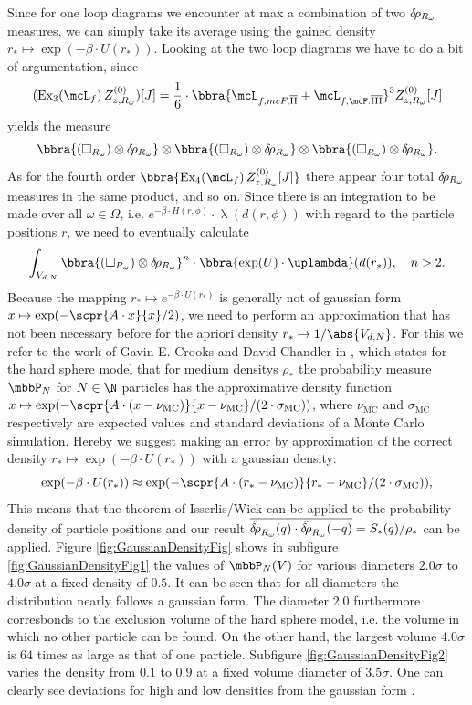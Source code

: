 



Since for one loop diagrams we encounter at max a combination of two $\delta\hspace*{-0.15em}\rho_{R_\omega}$ measures, we can simply take its average using the gained density $r_*\mapsto\exp(-\beta\cdot U(r_*))$. Looking at the two loop diagrams we have to do a bit of argumentation, since
\[
    (\text{Ex}_3(\mcL_f)\,Z_{z,R_\omega}^{(0)})[J] = \frac{1}{6}\cdot\bbra{
        \mcL_{f,mcF,\overline{\text{II}}} + \mcL_{f,\mcF.\overline{\text{III}}}
    }^3Z_{z,R_\omega}^{(0)}[J]
\] 
yields the measure
\[
    \bbra{(\square_{R_\omega})\otimes\drho_{R_\omega}}\otimes\bbra{(\square_{R_\omega})\otimes\drho_{R_\omega}}\otimes\bbra{(\square_{R_\omega})\otimes\drho_{R_\omega}}.
\]
As for the fourth order $\bbra{\text{Ex}_4(\mcL_f)\,Z_{z,R_\omega}^{(0)}[J]}$ there appear four total $\delta\hspace*{-0.15em}\rho_{R_\omega}$ measures in the same product, and so on. Since there is an integration to be made over all $\omega\in\Omega$, i.e. $e^{-\beta\cdot H(r,\phi)}\cdot\uplambda(d(r,\phi))$ with regard to the particle positions $r$, we need to eventually calculate
\[
    \int_{V_{d,N}}\bbra{(\square_{R_\omega})\otimes\drho_{R_\omega}}^n\cdot\bbra{\exp(U)\cdot\uplambda}(d(r_*)),\quad n>2.
\]
Because the mapping $r_*\mapsto e^{-\beta\cdot U(r_*)}$ is generally not of gaussian form $x\mapsto \exp(-\scpr{A\cdot x}{x}/2)$, we need to perform an approximation that has not been necessary before for the apriori density $r_*\mapsto 1/\abs{V_{d,N}}$. For this we refer to the work of Gavin E. Crooks and David Chandler in \cite{PhysRevE.56.4217}, which states for the hard sphere model that for medium densitys $\rho_*$ the probability measure $\mbbP_N$ for $N\in\N$ particles has the approximative density function $x\mapsto \exp(-\scpr{A\cdot (x - \nu_{\text{MC}})}{x - \nu_{\text{MC}}}/(2\cdot\sigma_{\text{MC}}))$, where $\nu_{\text{MC}}$ and $\sigma_{\text{MC}}$ respectively are expected values and standard deviations of a Monte Carlo simulation. Hereby we suggest making an error by approximation of the correct density $r_*\mapsto\exp(-\beta\cdot U(r_*))$ with a gaussian density:
\[
    \exp(-\beta\cdot U(r_*))\approx\exp(-\scpr{A\cdot (r_* - \nu_{\text{MC}})}{r_* - \nu_{\text{MC}}}/(2\cdot\sigma_{\text{MC}})),
\]
This means that the theorem of Isserlis/Wick can be applied to the probability density of particle positions and our result $\overline{\hat{\delta\hspace*{-0.15em}\rho}_{R_\omega}(q)\cdot\hat{\delta\hspace*{-0.15em}\rho}_{R_\omega}(-q)} = S_*(q)/\rho_*$ can be applied. Figure \ref{fig:GaussianDensityFig} shows in subfigure \ref{fig:GaussianDensityFig1} the values of $\mbbP_N(V)$ for various diameters $2.0\sigma$ to $4.0\sigma$ at a fixed density of $0.5$. It can be seen that for all diameters the distribution nearly follows a gaussian form. The diameter $2.0$ furthermore corresbonds to the exclusion volume of the hard sphere model, i.e. the volume in which no other particle can be found. On the other hand, the largest volume $4.0\sigma$ is $64$ times as large as that of one particle. Subfigure \ref{fig:GaussianDensityFig2} varies the density from $0.1$ to $0.9$ at a fixed volume diameter of $3.5\sigma$. One can clearly see deviations for high and low densities from the gaussian form \cite{PhysRevE.56.4217}.
